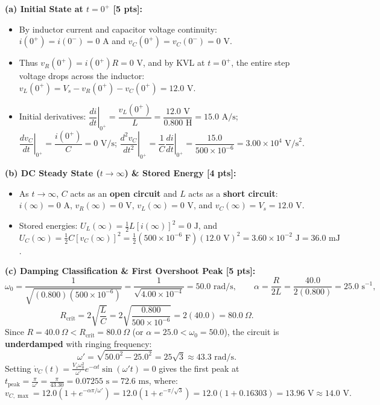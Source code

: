 \documentclass[10pt,letterpaper]{article}
\begin{document}
  \textbf{(a) Initial State at $t = 0^+$ [5 pts]:}
  \begin{itemize}
    \item By inductor current and capacitor voltage continuity: $i(0^+) = i(0^-) = 0\text{ A}$ and $v_C(0^+) = v_C(0^-) = 0\text{ V}$.
    \item Thus $v_R(0^+) = i(0^+) R = 0\text{ V}$, and by KVL at $t = 0^+$, the entire step voltage drops across the inductor: $v_L(0^+) = V_s - v_R(0^+) - v_C(0^+) = 12.0\text{ V}$.
    \item Initial derivatives: $\left.\dfrac{di}{dt}\right|_{0^+} = \dfrac{v_L(0^+)}{L} = \dfrac{12.0\text{ V}}{0.800\text{ H}} = 15.0\text{ A/s}$; $\left.\dfrac{dv_C}{dt}\right|_{0^+} = \dfrac{i(0^+)}{C} = 0\text{ V/s}$; $\left.\dfrac{d^2 v_C}{dt^2}\right|_{0^+} = \dfrac{1}{C}\left.\dfrac{di}{dt}\right|_{0^+} = \dfrac{15.0}{500\times 10^{-6}} = 3.00\times 10^4\text{ V/s}^2$.
  \end{itemize}
  \textbf{(b) DC Steady State ($t \to \infty$) \& Stored Energy [4 pts]:}
  \begin{itemize}
    \item As $t \to \infty$, $C$ acts as an \textbf{open circuit} and $L$ acts as a \textbf{short circuit}: $i(\infty) = 0\text{ A}$, $v_R(\infty) = 0\text{ V}$, $v_L(\infty) = 0\text{ V}$, and $v_C(\infty) = V_s = 12.0\text{ V}$.
    \item Stored energies: $U_L(\infty) = \frac{1}{2}L[i(\infty)]^2 = 0\text{ J}$, and $U_C(\infty) = \frac{1}{2}C[v_C(\infty)]^2 = \frac{1}{2}(500\times 10^{-6}\text{ F})(12.0\text{ V})^2 = 3.60\times 10^{-2}\text{ J} = 36.0\text{ mJ}$.
  \end{itemize}
  \textbf{(c) Damping Classification \& First Overshoot Peak [5 pts]:}
  $$\omega_0 = \frac{1}{\sqrt{(0.800)(500\times 10^{-6})}} = \frac{1}{\sqrt{4.00\times 10^{-4}}} = 50.0\text{ rad/s}, \qquad \alpha = \frac{R}{2L} = \frac{40.0}{2(0.800)} = 25.0\text{ s}^{-1},$$
  $$R_{\text{crit}} = 2\sqrt{\frac{L}{C}} = 2\sqrt{\frac{0.800}{500\times 10^{-6}}} = 2(40.0) = 80.0\ \Omega.$$
  Since $R = 40.0\ \Omega < R_{\text{crit}} = 80.0\ \Omega$ (or $\alpha = 25.0 < \omega_0 = 50.0$), the circuit is \textbf{underdamped} with ringing frequency:
  $$\omega' = \sqrt{50.0^2 - 25.0^2} = 25\sqrt{3} \approx 43.3\text{ rad/s}.$$
  Setting $\dot{v}_C(t) = \frac{V_s \omega_0^2}{\omega'} e^{-\alpha t}\sin(\omega' t) = 0$ gives the first peak at $t_{\text{peak}} = \frac{\pi}{\omega'} = \frac{\pi}{43.30} = 0.07255\text{ s} = 72.6\text{ ms}$, where:
  $$v_{C,\max} = 12.0\left(1 + e^{-\alpha \pi/\omega'}\right) = 12.0\left(1 + e^{-\pi/\sqrt{3}}\right) = 12.0(1 + 0.16303) = 13.96\text{ V} \approx 14.0\text{ V}.$$
\end{document}
